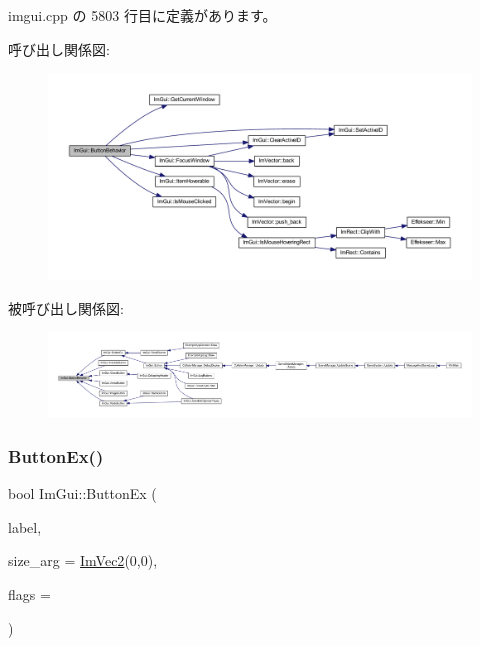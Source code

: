  imgui.\+cpp の 5803 行目に定義があります。

呼び出し関係図\+:\nopagebreak
\begin{figure}[H]
\begin{center}
\leavevmode
\includegraphics[width=350pt]{namespace_im_gui_a65a4f18b1bc8ce0f351687922089f374_cgraph}
\end{center}
\end{figure}
被呼び出し関係図\+:
\nopagebreak
\begin{figure}[H]
\begin{center}
\leavevmode
\includegraphics[width=350pt]{namespace_im_gui_a65a4f18b1bc8ce0f351687922089f374_icgraph}
\end{center}
\end{figure}
\mbox{\label{namespace_im_gui_ae479220c66b039874c6e4c9e9b22849f}} 
\subsubsection{\texorpdfstring{Button\+Ex()}{ButtonEx()}}
{\footnotesize\ttfamily bool Im\+Gui\+::\+Button\+Ex (\begin{DoxyParamCaption}\item[{const char $\ast$}]{label,  }\item[{const \mbox{\hyperlink{struct_im_vec2}{Im\+Vec2}} \&}]{size\+\_\+arg = {\ttfamily \mbox{\hyperlink{struct_im_vec2}{Im\+Vec2}}(0,0)},  }\item[{\mbox{\hyperlink{imgui__internal_8h_a990fae518aa1d95f571ee40989de4c22}{Im\+Gui\+Button\+Flags}}}]{flags = {} }\end{DoxyParamCaption})}



